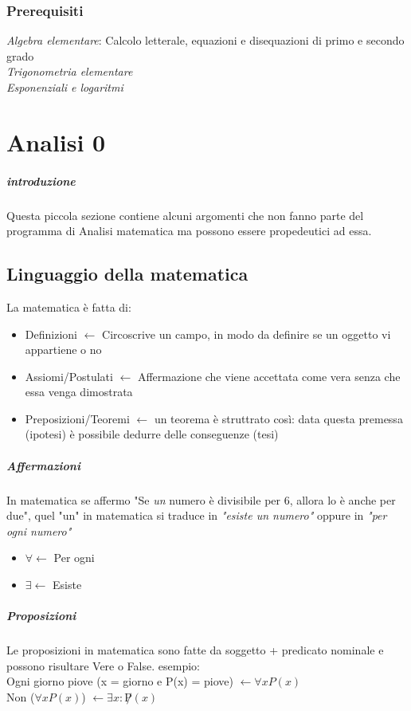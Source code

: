 \documentclass[12pt, a4paper, openany]{book}
\begin{document}
\subsection*{Prerequisiti}
\emph{Algebra elementare}: Calcolo letterale, equazioni e disequazioni di primo e secondo grado
\\\emph{Trigonometria elementare}
\\\emph{Esponenziali e logaritmi}

\chapter{Analisi 0}
\paragraph{introduzione}
Questa piccola sezione contiene alcuni argomenti che non fanno parte del programma di Analisi matematica ma possono essere propedeutici ad essa.
\section{Linguaggio della matematica }
La matematica è fatta di:
\begin{itemize}
	\item Definizioni $\leftarrow$ Circoscrive un campo, in modo da definire se un oggetto vi appartiene o no
	\item Assiomi/Postulati $\leftarrow$  Affermazione che viene accettata come vera senza che essa venga dimostrata
	\item Preposizioni/Teoremi $\leftarrow$  un teorema è struttrato così: data questa premessa (ipotesi) è possibile dedurre delle conseguenze (tesi)
\end{itemize}
\paragraph*{Affermazioni} In matematica se affermo "Se \emph{un} numero è divisibile per 6, allora lo è anche per due", quel "un" in matematica si traduce in \emph{"esiste un numero"} oppure in \emph{"per ogni numero"}
\begin{itemize}
	\item $\forall \leftarrow$ Per ogni
	\item $\exists \leftarrow$ Esiste
\end{itemize}

\paragraph*{Proposizioni}
Le proposizioni in matematica sono fatte da soggetto + predicato nominale e possono risultare Vere o False.
esempio:
\\Ogni giorno piove (x = giorno e P(x) = piove) $\leftarrow \forall x P(x)$
\\Non ($\forall x P(x)$) $\leftarrow \exists x : \not P(x)$
\end{document}
